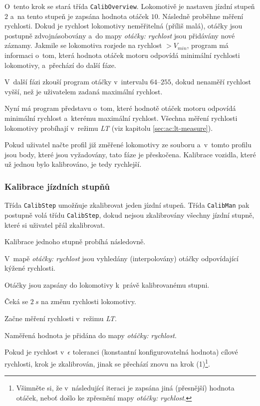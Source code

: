 O~tento krok se stará třída \texttt{CalibOverview}.  Lokomotivě je nastaven
jízdní stupeň $2$ a~na tento stupeň je zapsána hodnota otáček $10$. Následně
proběhne měření rychlosti. Dokud je rychlost lokomotivy neměřitelná (příliš
malá), otáčky jsou postupně zdvojnásobovány a~do mapy \textit{otáčky: rychlost}
jsou přidávány nové záznamy. Jakmile se lokomotiva rozjede na rychlost $>
V_{min}$, program má informaci o~tom, která hodnota otáček motoru odpovídá
minimální rychlosti lokomotivy, a~přechází do další fáze.

V~další fázi zkouší program otáčky v~intervalu $64$--$255$, dokud nenaměří
rychlost vyšší, než je uživatelem zadaná maximální rychlost.

Nyní má program představu o~tom, které hodnotě otáček motoru odpovídá minimální
rychlost a~kterému maximální rychlost. Všechna měření rychlosti lokomotivy
probíhají v~režimu \textit{\gls{LT}} (viz kapitolu \ref{sec:ac:lt-measure}).

Pokud uživatel načte profil již změřené lokomotivy ze souboru a~v~tom\-to
profilu jsou body, které jsou vyžadovány, tato fáze je přeskočena. Kalibrace
vozidla, které už jednou bylo kalibrováno, je tedy rychlejší.

\subsubsection{Kalibrace jízdních stupňů}

Třída \texttt{CalibStep} umožňuje zkalibrovat jeden jízdní stupeň. Třída
\texttt{CalibMan} pak postupně volá třídu \texttt{CalibStep}, dokud nejsou
zkalibrovány všechny jízdní stupně, které si uživatel přál zkalibrovat.

Kalibrace jednoho stupně probíhá následovně.

\begin{compactenum}
\item V~mapě \textit{otáčky: rychlost} jsou vyhledány (interpolovány) otáčky
      odpovídající kýžené rychlosti.
\item Otáčky jsou zapsány do lokomotivy k~právě kalibrovanému stup\-ni.
\item Čeká se $2\ s$ na změnu rychlosti lokomotivy.
\item Začne měření rychlosti v~režimu \textit{\gls{LT}}.
\item Naměřená hodnota je přidána do mapy \textit{otáčky: rychlost}.
\item Pokud je rychlost v~$\epsilon$ toleranci (konstantní konfigurovatelná hodnota)
      cílové rychlosti, krok je zkalibrován, jinak se přechází znovu na krok
      (1)\footnote{Všimněte si, že v~následující iteraci je zapsána jiná (přesnější)
      hodnota otáček, neboť došlo ke zpřesnění mapy \textit{otáčky: rychlost}.}.
\end{compactenum}

